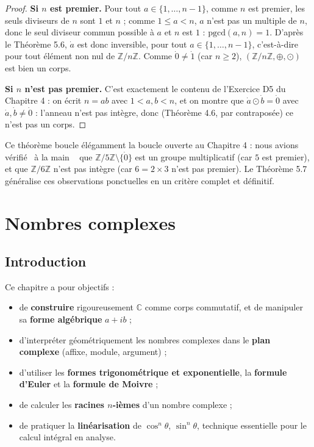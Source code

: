 \documentclass[a4paper,12pt,openany]{book}
\providecommand{\og}{\guillemotleft~}
\providecommand{\fg}{\ifhmode~\fi\guillemotright}
\begin{document}
\begin{proof}
\textbf{Si $n$ est premier.} Pour tout $a\in\{1,\dots,n-1\}$, comme $n$
est premier, les seuls diviseurs de $n$ sont $1$ et $n$ ; comme
$1\leq a<n$, $a$ n'est pas un multiple de $n$, donc le seul diviseur
commun possible à $a$ et $n$ est $1$ : $\mathrm{pgcd}(a,n)=1$. D'après le
Théorème 5.6, $\dot a$ est donc inversible, pour tout
$a\in\{1,\dots,n-1\}$, c'est-à-dire pour tout élément non nul de
$\mathbb{Z}/n\mathbb{Z}$. Comme $\dot0\neq\dot1$ (car $n\geq2$),
$(\mathbb{Z}/n\mathbb{Z},\oplus,\odot)$ est bien un corps.

\textbf{Si $n$ n'est pas premier.} C'est exactement le contenu de
l'Exercice D5 du Chapitre 4 : on écrit $n=ab$ avec $1<a,b<n$, et on montre
que $\dot a \odot \dot b = \dot 0$ avec $\dot a,\dot b\neq\dot 0$ :
l'anneau n'est pas intègre, donc (Théorème 4.6, par contraposée) ce n'est
pas un corps.
\end{proof}

\begin{remarque}
Ce théorème boucle élégamment la boucle ouverte au Chapitre 4 : nous avions
vérifié \og à la main \fg{} que $\mathbb{Z}/5\mathbb{Z}\setminus\{\dot0\}$
est un groupe multiplicatif (car $5$ est premier), et que
$\mathbb{Z}/6\mathbb{Z}$ n'est pas intègre (car $6=2\times3$ n'est pas
premier). Le Théorème 5.7 généralise ces observations ponctuelles en un
critère complet et définitif.
\end{remarque}


\chapter{Nombres complexes}

\section{Introduction}


Ce chapitre a pour objectifs :
\begin{itemize}
  \item de \textbf{construire} rigoureusement $\mathbb{C}$ comme corps
  commutatif, et de manipuler sa \textbf{forme algébrique} $a+ib$ ;
  \item d'interpréter géométriquement les nombres complexes dans le
  \textbf{plan complexe} (affixe, module, argument) ;
  \item d'utiliser les \textbf{formes trigonométrique et exponentielle},
  la \textbf{formule d'Euler} et la \textbf{formule de Moivre} ;
  \item de calculer les \textbf{racines $n$-ièmes} d'un nombre complexe ;
  \item de pratiquer la \textbf{linéarisation} de $\cos^n\theta$,
  $\sin^n\theta$, technique essentielle pour le calcul intégral en
  analyse.
\end{itemize}
\end{document}
